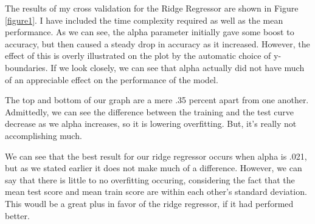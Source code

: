 \documentclass[12pt]{article}
\begin{document}
The results of my cross validation for the Ridge Regressor are shown in Figure \ref{figure1}. I have included the time
complexity required as well as the mean performance. As we can see, the alpha parameter initially gave some boost to 
accuracy, but then caused a steady drop in accuracy as it increased. However, the effect of this is overly illustrated
on the plot by the automatic choice of y-boundaries. If we look closely, we can see that alpha actually did not  have 
much of an appreciable effect on the performance of the model. 

The top and bottom of our graph are a mere .35 percent apart from one another. Admittedly, we can see the difference 
between the training and the test curve decrease as we alpha increases, so it is lowering overfitting. But, it's really 
not accomplishing much. 

We can see that the best result for our ridge regressor occurs when alpha is .021, but as we stated earlier it does not 
make much of a difference. However, we can say that there is little to no overfitting occuring, considering the fact 
that the mean test score and mean train score are within each other's standard deviation. This woudl be a great plus in favor 
of the ridge regressor, if it had performed better.
\end{document}
